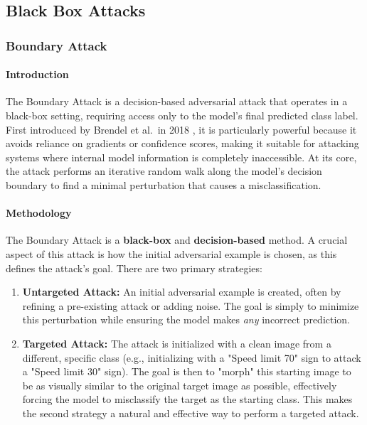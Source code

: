 \documentclass[../main.tex]{subfiles}
\begin{document}
\subsection{Black Box Attacks}
\subsubsection{Boundary Attack}

\paragraph{Introduction}
The Boundary Attack is a decision-based adversarial attack that operates in a black-box setting, requiring access only to the model's final predicted class label. First introduced by Brendel et al.\ in 2018 \cite{brendel2018decisionbasedadversarialattacksreliable}, it is particularly powerful because it avoids reliance on gradients or confidence scores, making it suitable for attacking systems where internal model information is completely inaccessible. At its core, the attack performs an iterative random walk along the model's decision boundary to find a minimal perturbation that causes a misclassification.

\paragraph{Methodology}

The Boundary Attack is a \textbf{black-box} and \textbf{decision-based} method. A crucial aspect of this attack is how the initial adversarial example is chosen, as this defines the attack's goal. There are two primary strategies:
\begin{enumerate}
    \item \textbf{Untargeted Attack:} An initial adversarial example is created, often by refining a pre-existing attack or adding noise. The goal is simply to minimize this perturbation while ensuring the model makes \textit{any} incorrect prediction.
    \item \textbf{Targeted Attack:} The attack is initialized with a clean image from a different, specific class (e.g., initializing with a "Speed limit 70" sign to attack a "Speed limit 30" sign). The goal is then to "morph" this starting image to be as visually similar to the original target image as possible, effectively forcing the model to misclassify the target as the starting class. This makes the second strategy a natural and effective way to perform a targeted attack.
\end{enumerate}
\end{document}
